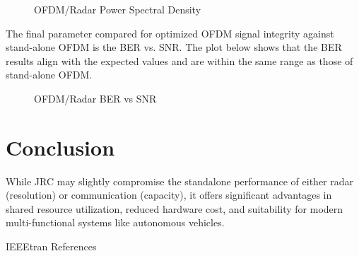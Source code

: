 \documentclass[conference]{IEEEtran}
\begin{document}
\begin{figure}[H]
\centering
{}
\caption{OFDM/Radar Power Spectral Density}
\end{figure} 
The final parameter compared for optimized OFDM signal integrity against stand-alone OFDM is the BER vs. SNR. The plot below shows that the BER results align with the expected values and are within the same range as those of stand-alone OFDM.
\begin{figure}[H]
\centering
{}
\caption{OFDM/Radar BER vs SNR}
\end{figure} 
\section {Conclusion}
While JRC may slightly compromise the standalone performance of either radar (resolution) or communication (capacity), it offers significant advantages in shared resource utilization, reduced hardware cost, and suitability for modern multi-functional systems like autonomous vehicles.


	 {IEEEtran}
	 {References}
	
  
\end{document}
